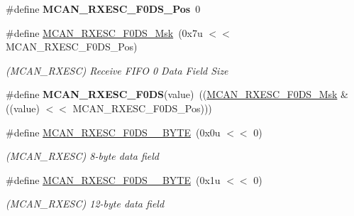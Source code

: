 \begin{DoxyCompactItemize}
\mbox{\label{group__SAME70__MCAN_ga5f7bf5d98e3fb11f358c486bf303ac7c}} 
\#define {\bfseries M\+C\+A\+N\+\_\+\+R\+X\+E\+S\+C\+\_\+\+F0\+D\+S\+\_\+\+Pos}~0
\item 
\mbox{\label{group__SAME70__MCAN_ga61d2c8bc64a0a7d4f990f8319527abb0}} 
\#define \mbox{\hyperlink{group__SAME70__MCAN_ga61d2c8bc64a0a7d4f990f8319527abb0}{M\+C\+A\+N\+\_\+\+R\+X\+E\+S\+C\+\_\+\+F0\+D\+S\+\_\+\+Msk}}~(0x7u $<$$<$ M\+C\+A\+N\+\_\+\+R\+X\+E\+S\+C\+\_\+\+F0\+D\+S\+\_\+\+Pos)
\begin{DoxyCompactList}\small\item\em (M\+C\+A\+N\+\_\+\+R\+X\+E\+SC) Receive F\+I\+FO 0 Data Field Size \end{DoxyCompactList}\item 
\mbox{\label{group__SAME70__MCAN_ga8afc7eb9fcb473bdb61a75554b02c595}} 
\#define {\bfseries M\+C\+A\+N\+\_\+\+R\+X\+E\+S\+C\+\_\+\+F0\+DS}(value)~((\mbox{\hyperlink{group__SAMV71__MCAN_ga61d2c8bc64a0a7d4f990f8319527abb0}{M\+C\+A\+N\+\_\+\+R\+X\+E\+S\+C\+\_\+\+F0\+D\+S\+\_\+\+Msk}} \& ((value) $<$$<$ M\+C\+A\+N\+\_\+\+R\+X\+E\+S\+C\+\_\+\+F0\+D\+S\+\_\+\+Pos)))
\item 
\mbox{\label{group__SAME70__MCAN_ga670e64b5248e491fe46b5fdbb74abc0b}} 
\#define \mbox{\hyperlink{group__SAME70__MCAN_ga670e64b5248e491fe46b5fdbb74abc0b}{M\+C\+A\+N\+\_\+\+R\+X\+E\+S\+C\+\_\+\+F0\+D\+S\+\_\+\_\+\+B\+Y\+TE}}~(0x0u $<$$<$ 0)
\begin{DoxyCompactList}\small\item\em (M\+C\+A\+N\+\_\+\+R\+X\+E\+SC) 8-\/byte data field \end{DoxyCompactList}\item 
\mbox{\label{group__SAME70__MCAN_ga41a23ece8281a58f51f1963d955af330}} 
\#define \mbox{\hyperlink{group__SAME70__MCAN_ga41a23ece8281a58f51f1963d955af330}{M\+C\+A\+N\+\_\+\+R\+X\+E\+S\+C\+\_\+\+F0\+D\+S\+\_\+\_\+\+B\+Y\+TE}}~(0x1u $<$$<$ 0)
\begin{DoxyCompactList}\small\item\em (M\+C\+A\+N\+\_\+\+R\+X\+E\+SC) 12-\/byte data field \end{DoxyCompactList}\item 
\mbox{\label{group__SAME70__MCAN_ga92e90e312d3f3c6e618e127e2e184b98}} 

\end{DoxyCompactItemize}
